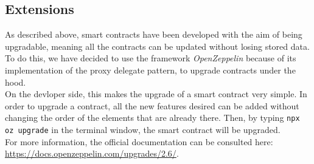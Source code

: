 \subsection{Extensions}  %
As described above, smart contracts have been developed with the aim of being upgradable, meaning all the contracts can be updated without losing stored data. \\
To do this, we have decided to use the framework \textit{OpenZeppelin} because of its implementation of the proxy delegate pattern, to upgrade contracts under the hood. \\
On the devloper side, this makes the upgrade of a smart contract very simple. In order to upgrade a contract, all the new features desired can be added without changing the order of the elements that are already there. Then, by typing \texttt{npx oz upgrade} in the terminal window, the smart contract will be upgraded. \\
For more information, the official documentation can be consulted here: \url{https://docs.openzeppelin.com/upgrades/2.6/}.